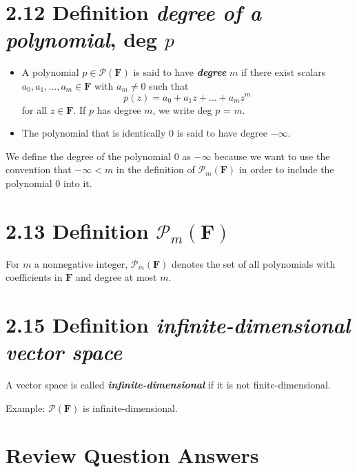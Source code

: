 \documentclass[12pt, letterpaper, oneside]{book}
\begin{document}
\section{2.12 Definition \textbf{\textit{degree of a polynomial}}, deg $p$}

\begin{itemize}
  \item A polynomial $p \in \mathcal{P}(\mathbf{F})$ is said to have \textbf{
    \textit{degree}} $m$ if there exist scalars $a_0, a_1, \ldots, a_m \in
    \mathbf{F}$ with $a_m \neq 0$ such that
    \[
      p(z) = a_0 + a_{1}z + \dots + a_{m}z^m
    \]
    for all $z \in \mathbf{F}$. If $p$ has degree $m$, we write deg $p$ = $m$.
  \item The polynomial that is identically 0 is said to have degree $-\infty$.
\end{itemize}

We define the degree of the polynomial $0$ as $-\infty$ because we want to use
the convention that $-\infty < m$ in the definition of $\mathcal{P}_m(\mathbf{
F})$ in order to include the polynomial $0$ into it.

\section{2.13 Definition $\mathcal{P}_m(\mathbf{F})$}

For $m$ a nonnegative integer, $\mathcal{P}_m(\mathbf{F})$ denotes the set of
all polynomials with coefficients in $\mathbf{F}$ and degree at most $m$.

\section{2.15 Definition \textbf{\textit{infinite-dimensional vector space}}}

A vector space is called \textbf{\textit{infinite-dimensional}} if it is not
finite-dimensional.

Example: $\mathcal{P}(\mathbf{F})$ is infinite-dimensional.

\section{Review Question Answers}
\end{document}
